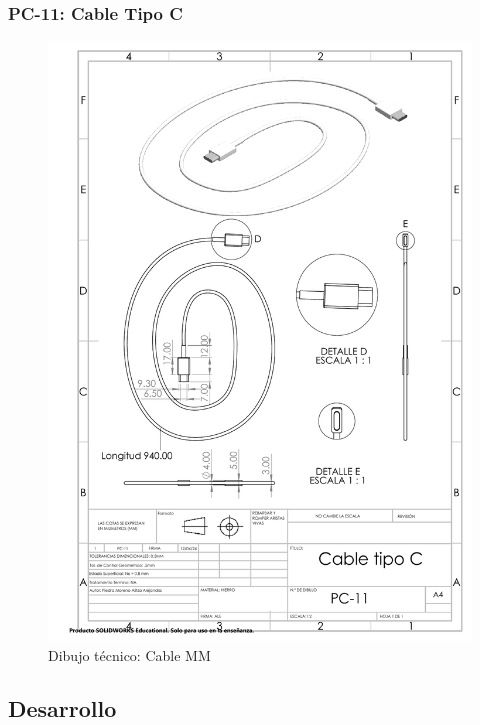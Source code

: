    \subsubsection{PC-11: Cable Tipo C }
    \begin{figure}[H]
        \centering
        \includegraphics[trim = {7mm 1mm 1mm 1mm},clip,scale=0.4]{22/Img/cableCDibujo.PDF}
        \caption{Dibujo técnico: Cable MM}
        \label{fig:enter-label9}
    \end{figure}
    
    
    
    \subsection{Desarrollo}
    
    
    
    
    
